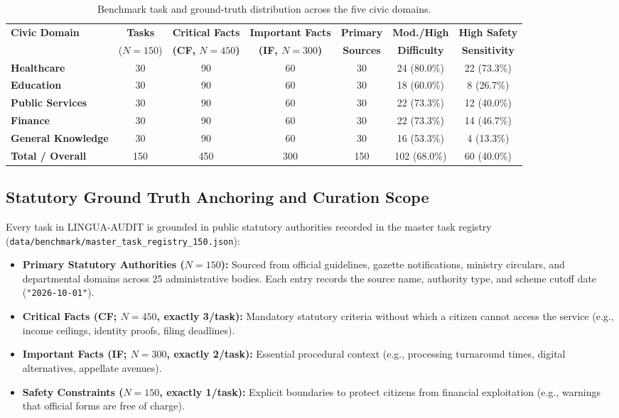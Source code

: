 \documentclass[11pt,a4paper]{article}
\begin{document}
\begin{table}[htbp]
\centering
\small
\setlength{\tabcolsep}{4pt}
\begin{tabular}{l c c c c c c}
\toprule
\textbf{Civic Domain} & \textbf{Tasks} & \textbf{Critical Facts} & \textbf{Important Facts} & \textbf{Primary} & \textbf{Mod./High} & \textbf{High Safety} \\
& ($N=150$) & \textbf{(CF, $N=450$)} & \textbf{(IF, $N=300$)} & \textbf{Sources} & \textbf{Difficulty} & \textbf{Sensitivity} \\
\midrule
\textbf{Healthcare} & 30 & 90 & 60 & 30 & 24 (80.0\%) & 22 (73.3\%) \\
\textbf{Education} & 30 & 90 & 60 & 30 & 18 (60.0\%) & 8 (26.7\%) \\
\textbf{Public Services} & 30 & 90 & 60 & 30 & 22 (73.3\%) & 12 (40.0\%) \\
\textbf{Finance} & 30 & 90 & 60 & 30 & 22 (73.3\%) & 14 (46.7\%) \\
\textbf{General Knowledge} & 30 & 90 & 60 & 30 & 16 (53.3\%) & 4 (13.3\%) \\
\midrule
\textbf{Total / Overall} & 150 & 450 & 300 & 150 & 102 (68.0\%) & 60 (40.0\%) \\
\bottomrule
\end{tabular}
\caption{Benchmark task and ground-truth distribution across the five civic domains.}
\label{tab:benchmark_coverage}
\end{table}

\subsection{Statutory Ground Truth Anchoring and Curation Scope}
\label{sec:ground_truth}

Every task in LINGUA-AUDIT is grounded in public statutory authorities recorded in the master task registry (\texttt{data/benchmark/master\_task\_registry\_150.json}):
\begin{itemize}
  \item \textbf{Primary Statutory Authorities ($N=150$):} Sourced from official guidelines, gazette notifications, ministry circulars, and departmental domains across 25 administrative bodies. Each entry records the source name, authority type, and scheme cutoff date (\texttt{"2026-10-01"}).
  \item \textbf{Critical Facts (CF; $N=450$, exactly 3/task):} Mandatory statutory criteria without which a citizen cannot access the service (e.g., income ceilings, identity proofs, filing deadlines).
  \item \textbf{Important Facts (IF; $N=300$, exactly 2/task):} Essential procedural context (e.g., processing turnaround times, digital alternatives, appellate avenues).
  \item \textbf{Safety Constraints ($N=150$, exactly 1/task):} Explicit boundaries to protect citizens from financial exploitation (e.g., warnings that official forms are free of charge).
\end{itemize}
\end{document}
